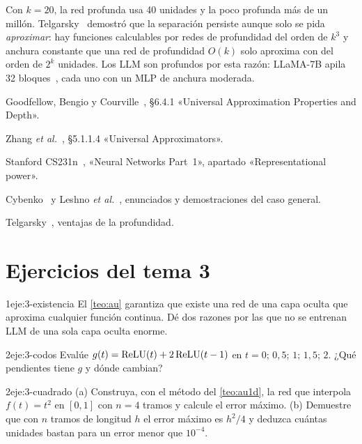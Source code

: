 Con $k=20$, la red profunda usa 40 unidades y la poco profunda más de un millón. Telgarsky~\cite{telgarsky} demostró que la separación persiste aunque solo se pida \emph{aproximar}: hay funciones calculables por redes de profundidad del orden de $k^{3}$ y anchura constante que una red de profundidad $O(k)$ solo aproxima con del orden de $2^{k}$ unidades. Los LLM son profundos por esta razón: LLaMA-7B apila 32 bloques~\cite[§2]{touvron}, cada uno con un MLP de anchura moderada.

\begin{lecturas}
\item Goodfellow, Bengio y Courville~\cite{gbc}, §6.4.1 «Universal Approximation Properties and Depth».
\item Zhang \emph{et al.}~\cite{d2l}, §5.1.1.4 «Universal Approximators».
\item Stanford CS231n~\cite{cs231n}, «Neural Networks Part~1», apartado «Representational power».
\item Cybenko~\cite{cybenko} y Leshno \emph{et al.}~\cite{leshno}, enunciados y demostraciones del caso general.
\item Telgarsky~\cite{telgarsky}, ventajas de la profundidad.
\end{lecturas}

\section*{Ejercicios del tema 3}

\begin{ejercicio}{1}{eje:3-existencia}
El \cref{teo:au} garantiza que existe una red de una capa oculta que aproxima cualquier función continua. Dé dos razones por las que no se entrenan LLM de una sola capa oculta enorme.
\end{ejercicio}

\begin{ejercicio}{2}{eje:3-codos}
Evalúe $g(t)=\operatorname{ReLU}(t)+2\operatorname{ReLU}(t-1)$ en $t=0$; $0{,}5$; $1$; $1{,}5$; $2$. ¿Qué pendientes tiene $g$ y dónde cambian?
\end{ejercicio}

\begin{ejercicio}{2}{eje:3-cuadrado}
(a) Construya, con el método del \cref{teo:au1d}, la red que interpola $f(t)=t^{2}$ en $[0,1]$ con $n=4$ tramos y calcule el error máximo. (b) Demuestre que con $n$ tramos de longitud $h$ el error máximo es $h^{2}/4$ y deduzca cuántas unidades bastan para un error menor que $10^{-4}$.
\end{ejercicio}


